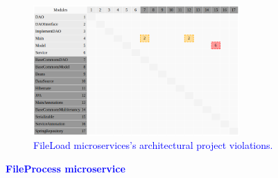 \documentclass[12pt]{article}
\begin{document}
\begin{figure}[ht]
\centering
\includegraphics[width=0.7\textwidth]{figuras/violacoesFileLoad.png}
\vspace{-0.2cm}
\caption{\textcolor{blue}{FileLoad microservices's architectural project violations.}}
\label{fig:microservices}
\end{figure}

\noindent\textbf{\large{\textcolor{blue}{FileProcess microservice}}}
\label{sec:ApendiceFileProccess}
\end{document}
